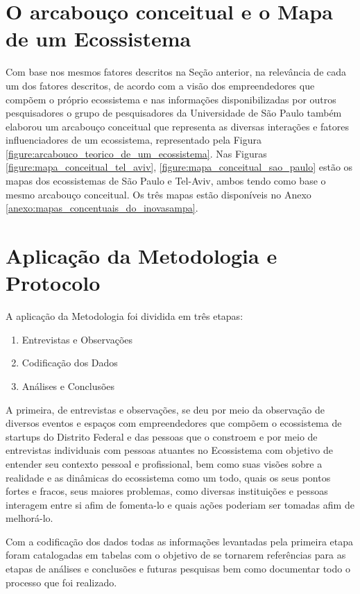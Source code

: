 \section{O arcabouço conceitual e o Mapa de um Ecossistema}
\label{subsection:arcabouco_conceitual_e_modelo}

Com base nos mesmos fatores descritos na Seção anterior, na relevância de cada um dos fatores descritos, de acordo com a visão dos empreendedores que compõem o próprio ecossistema e nas informações disponibilizadas por outros pesquisadores o grupo de pesquisadores da Universidade de São Paulo também elaborou um arcabouço conceitual que representa as diversas interações e fatores influenciadores de um ecossistema, representado pela Figura \ref{figure:arcabouco_teorico_de_um_ecossistema}. Nas Figuras \ref{figure:mapa_conceitual_tel_aviv}, \ref{figure:mapa_conceitual_sao_paulo} estão os mapas dos ecossistemas de São Paulo e Tel-Aviv, ambos tendo como base o mesmo arcabouço conceitual. Os três mapas estão disponíveis no Anexo \ref{anexo:mapas_concentuais_do_inovasampa}.

\section{Aplicação da Metodologia e Protocolo}
\label{section:aplicacao_da_metodologia}

A aplicação da Metodologia foi dividida em três etapas:

\begin{enumerate}
  \item Entrevistas e Observações
  \item Codificação dos Dados
  \item Análises e Conclusões
\end{enumerate}

A primeira, de entrevistas e observações, se deu por meio da observação de diversos eventos e espaços com empreendedores que compõem o ecossistema de startups do Distrito Federal e das pessoas que o constroem e por meio de entrevistas individuais com pessoas atuantes no Ecossistema com objetivo de entender seu contexto pessoal e profissional, bem como suas visões sobre a realidade e as dinâmicas do ecossistema como um todo, quais os seus pontos fortes e fracos, seus maiores problemas, como diversas instituições e pessoas interagem entre si afim de fomenta-lo e quais ações poderiam ser tomadas afim de melhorá-lo.

Com a codificação dos dados todas as informações levantadas pela primeira etapa foram catalogadas em tabelas com o objetivo de se tornarem referências para as etapas de análises e conclusões e futuras pesquisas bem como documentar todo o processo que foi realizado. 

